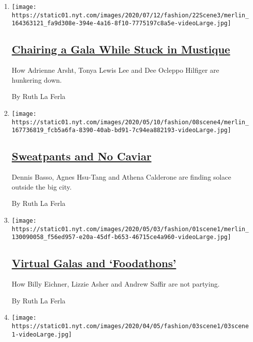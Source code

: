 \begin{enumerate}
\def\labelenumi{\arabic{enumi}.}
\item
  \texttt{[image: https://static01.nyt.com/images/2020/07/12/fashion/22Scene3/merlin\_164363121\_fa9d308e-394e-4a16-8f10-7775197c8a5e-videoLarge.jpg]}

  \hypertarget{chairing-a-gala-while-stuck-in-mustique}{%
  \subsection{\texorpdfstring{\href{/2020/05/25/style/chairing-a-gala-while-stuck-in-mustique.html}{Chairing
  a Gala While Stuck in
  Mustique}}{Chairing a Gala While Stuck in Mustique}}\label{chairing-a-gala-while-stuck-in-mustique}}

  How Adrienne Arsht, Tonya Lewis Lee and Dee Ocleppo Hilfiger are
  hunkering down.

  By Ruth La Ferla
\item
  \texttt{[image: https://static01.nyt.com/images/2020/05/10/fashion/08scene4/merlin\_167736819\_fcb5a6fa-8390-40ab-bd91-7c94ea882193-videoLarge.jpg]}

  \hypertarget{sweatpants-and-no-caviar}{%
  \subsection{\texorpdfstring{\href{/2020/05/08/style/sweatpants-and-no-caviar.html}{Sweatpants
  and No
  Caviar}}{Sweatpants and No Caviar}}\label{sweatpants-and-no-caviar}}

  Dennis Basso, Agnes Hsu-Tang and Athena Calderone are finding solace
  outside the big city.

  By Ruth La Ferla
\item
  \texttt{[image: https://static01.nyt.com/images/2020/05/03/fashion/01scene1/merlin\_130090058\_f56ed957-e20a-45df-b653-46715ce4a960-videoLarge.jpg]}

  \hypertarget{virtual-galas-and-foodathons}{%
  \subsection{\texorpdfstring{\href{/2020/05/01/style/virtual-galas-and-foodathons.html}{Virtual
  Galas and
  `Foodathons'}}{Virtual Galas and `Foodathons'}}\label{virtual-galas-and-foodathons}}

  How Billy Eichner, Lizzie Asher and Andrew Saffir are not partying.

  By Ruth La Ferla
\item
  \texttt{[image: https://static01.nyt.com/images/2020/04/05/fashion/03scene1/03scene1-videoLarge.jpg]}


\end{enumerate}
